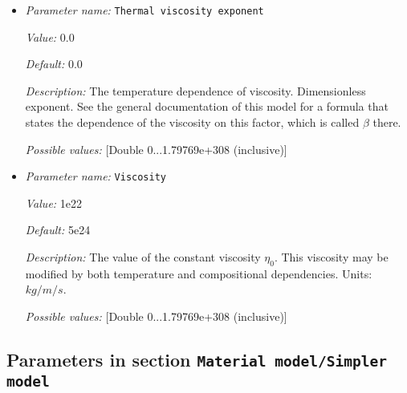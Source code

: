 \begin{itemize}
{\it Default:} 2e-5


{\it Description:} The value of the thermal expansion coefficient $\alpha$. Units: $1/K$.


{\it Possible values:} [Double 0...1.79769e+308 (inclusive)]
\item {\it Parameter name:} {\tt Thermal viscosity exponent}
\label{parameters:Material model/Simple model/Thermal viscosity exponent}


{\it Value:} 0.0


{\it Default:} 0.0


{\it Description:} The temperature dependence of viscosity. Dimensionless exponent. See the general documentation of this model for a formula that states the dependence of the viscosity on this factor, which is called $\beta$ there.


{\it Possible values:} [Double 0...1.79769e+308 (inclusive)]
\item {\it Parameter name:} {\tt Viscosity}
\label{parameters:Material model/Simple model/Viscosity}


{\it Value:} 1e22


{\it Default:} 5e24


{\it Description:} The value of the constant viscosity $\eta_0$. This viscosity may be modified by both temperature and compositional dependencies. Units: $kg/m/s$.


{\it Possible values:} [Double 0...1.79769e+308 (inclusive)]
\end{itemize}

\subsection{Parameters in section \tt Material model/Simpler model}
\label{parameters:Material_20model/Simpler_20model}

